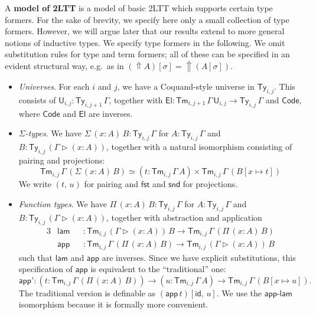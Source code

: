 \documentclass[acmsmall,review]{acmart}
\newcommand{\msf}[1]{\mathsf{#1}}
\newcommand{\ext}{\triangleright}
\newcommand{\Code}{\msf{Code}}
\newcommand{\El}{\msf{El}}
\newcommand{\lam}{\msf{lam}}
\newcommand{\app}{\msf{app}}
\newcommand{\Lift}{{\Uparrow}}
\renewcommand{\U}{\msf{U}}
\newcommand{\Ty}{\msf{Ty}}
\newcommand{\Tm}{\msf{Tm}}
\newcommand{\fst}{\msf{fst}}
\newcommand{\snd}{\msf{snd}}
\newcommand{\id}{\msf{id}}
\theoremstyle{remark}
\begin{document}
\begin{definition}
A \textbf{model of 2LTT} is a model of basic 2LTT which supports certain type
formers. For the sake of brevity, we specify here only a small collection of
type formers. However, we will argue later that our results extend to more
general notions of inductive types. We specify type formers in the following. We
omit substitution rules for type and term formers; all of these can be specified in
an evident structural way, e.g.\ as in $(\Lift A)[\sigma] = \Lift(A[\sigma])$.
\begin{itemize}
\item \emph{Universes}. For each $i$ and $j$, we have a Coquand-style universe
  \cite{coquand2018canonicity} in $\Ty_{i,j}$. This consists of $\U_{i,j} : \Ty_{i,j+1}\,\Gamma$,
  together with $\El : \Tm_{i,j+1}\,\Gamma\,\U_{i,j} \to \Ty_{i,j}\,\Gamma$ and $\Code$, where $\Code$
  and $\El$ are inverses.
\item \emph{$\Sigma$-types}. We have $\Sigma\,(x : A)\,B : \Ty_{i,j}\,\Gamma$ for $A : \Ty_{i,j}\,\Gamma$
  and $B : \Ty_{i,j}\,(\Gamma \ext (x : A))$, together with a natural isomorphism consisting of pairing and projections:
  \[ \Tm_{i,j}\,\Gamma\,(\Sigma\,(x : A)\,B) \simeq (t : \Tm_{i,j}\,\Gamma\,A) \times \Tm_{i,j}\,\Gamma\,(B[x\mapsto t]) \]
  We write $(t,\,u)$ for pairing and $\fst$ and $\snd$ for projections.
\item \emph{Function types}.
  We have $\Pi\,(x : A)\,B : \Ty_{i,j}\,\Gamma$ for $A : \Ty_{i,j}\,\Gamma$ and
  $B : \Ty_{i,j}\,(\Gamma \ext (x : A))$, together with abstraction and application
  \begin{alignat*}{3}
    & \lam &&: \Tm_{i,j}\,(\Gamma \ext (x : A))\,B \to \Tm_{i,j}\,\Gamma\,(\Pi\,(x : A)\,B) \\
    & \app &&: \Tm_{i,j}\,\Gamma\,(\Pi\,(x : A)\,B) \to \Tm_{i,j}\,(\Gamma \ext (x : A))\,B
  \end{alignat*}
  such that $\lam$ and $\app$ are inverses. Since we have explicit
  substitutions, this specification of $\app$ is equivalent to the
  ``traditional'' one:
  \[ \app' : (t : \Tm_{i,j}\,\Gamma\,(\Pi\,(x :
  A)\,B))\to (u : \Tm_{i,j}\,\Gamma\,A) \to \Tm_{i,j}\,\Gamma\,(B[x \mapsto
    u]).\]
  The traditional version is definable as $(\app\,t)[\id,\,u]$. We use
  the $\app$-$\lam$ isomorphism because it is formally more convenient.


\end{itemize}
\end{definition}
\end{document}

